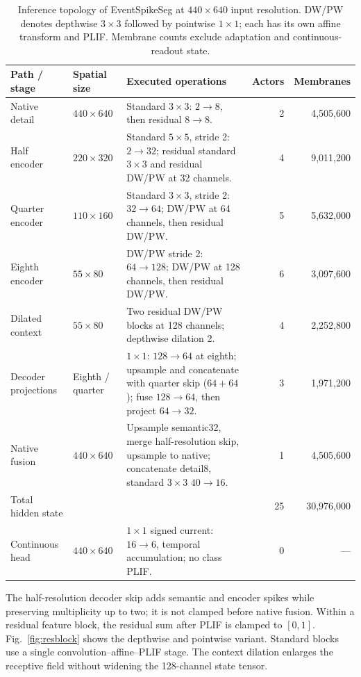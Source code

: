 \documentclass[preprint,12pt,number]{elsarticle}
\begin{document}
\begin{table}[!t]
\centering\small
\caption{Inference topology of EventSpikeSeg at $440\times640$ input resolution. DW/PW denotes depthwise $3\times3$ followed by pointwise $1\times1$; each has its own affine transform and PLIF. Membrane counts exclude adaptation and continuous-readout state.}
\label{tab:140k_layers}
\begin{tabularx}{\textwidth}{p{2.1cm}p{2.0cm}X r r}
\toprule
Path / stage & Spatial size & Executed operations & Actors & Membranes \\
\midrule
Native detail & $440\times640$ & Standard $3\times3$: $2\to8$, then residual $8\to8$. & 2 & 4,505,600 \\
Half encoder & $220\times320$ & Standard $5\times5$, stride 2: $2\to32$; residual standard $3\times3$ and residual DW/PW at 32 channels. & 4 & 9,011,200 \\
Quarter encoder & $110\times160$ & Standard $3\times3$, stride 2: $32\to64$; DW/PW at 64 channels, then residual DW/PW. & 5 & 5,632,000 \\
Eighth encoder & $55\times80$ & DW/PW stride 2: $64\to128$; DW/PW at 128 channels, then residual DW/PW. & 6 & 3,097,600 \\
Dilated context & $55\times80$ & Two residual DW/PW blocks at 128 channels; depthwise dilation 2. & 4 & 2,252,800 \\
Decoder projections & Eighth / quarter & $1\times1$: $128\to64$ at eighth; upsample and concatenate with quarter skip ($64+64$); fuse $128\to64$, then project $64\to32$. & 3 & 1,971,200 \\
Native fusion & $440\times640$ & Upsample semantic32, merge half-resolution skip, upsample to native; concatenate detail8, standard $3\times3$ $40\to16$. & 1 & 4,505,600 \\
\midrule
Total hidden state & & & 25 & 30,976,000 \\
Continuous head & $440\times640$ & $1\times1$ signed current: $16\to6$, temporal accumulation; no class PLIF. & 0 & --- \\
\bottomrule
\end{tabularx}
\end{table}

The half-resolution decoder skip adds semantic and encoder spikes while preserving multiplicity up to two; it is not clamped before native fusion. Within a residual feature block, the residual sum after PLIF is clamped to $[0,1]$. Fig.~\ref{fig:resblock} shows the depthwise and pointwise variant. Standard blocks use a single convolution--affine--PLIF stage. The context dilation enlarges the receptive field without widening the 128-channel state tensor.
\end{document}
